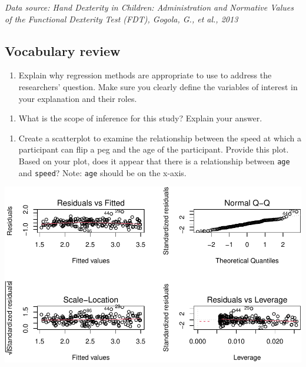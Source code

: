 \documentclass[
]{report}
\providecommand{\tightlist}{%
  \setlength{\itemsep}{0pt}\setlength{\parskip}{0pt}}
\begin{document}
\emph{Data source: Hand Dexterity in Children: Administration and Normative Values of the Functional Dexterity Test (FDT), Gogola, G., et al., 2013}

\hypertarget{vocabulary-review}{%
\subsection{Vocabulary review}\label{vocabulary-review}}

\begin{enumerate}
\def\labelenumi{\arabic{enumi}.}
\tightlist
\item
  Explain why regression methods are appropriate to use to address the researchers' question. Make sure you clearly define the variables of interest in your explanation and their roles.
\end{enumerate}

\vspace{1in}

\begin{enumerate}
\def\labelenumi{\arabic{enumi}.}
\setcounter{enumi}{1}
\tightlist
\item
  What is the scope of inference for this study? Explain your answer.
\end{enumerate}

\vspace{1in}

\begin{enumerate}
\def\labelenumi{\arabic{enumi}.}
\setcounter{enumi}{2}
\tightlist
\item
  Create a scatterplot to examine the relationship between the speed at which a participant can flip a peg and the age of the participant. Provide this plot. Based on your plot, does it appear that there is a relationship between \texttt{age} and \texttt{speed}? Note: \texttt{age} should be on the x-axis.
\end{enumerate}

\begin{center}\includegraphics[width=0.7\linewidth]{10-regression_files/figure-latex/unnamed-chunk-2-1} \end{center}
\end{document}
